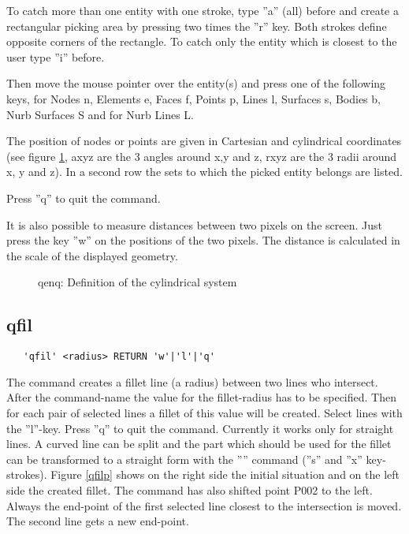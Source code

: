 \documentclass{article}
\begin{document}
To catch more than one entity with one stroke, type ''a'' (all) before and create a rectangular picking area by pressing two times the ''r'' key. Both strokes define opposite corners of the rectangle. To catch only the entity which is closest to the user type ''i'' before.

Then move the mouse pointer over the entity(s) and press one of the following keys, for Nodes n, Elements e, Faces f, Points p, Lines l, Surfaces s, Bodies b, Nurb Surfaces S and for Nurb Lines L.

The position of nodes or points are given in Cartesian and cylindrical coordinates (see figure \ref{qenqp}, axyz are the 3 angles around x,y and z, rxyz are the 3 radii around x, y and z). In a second row the sets to which the picked entity belongs are listed. 

Press ''q'' to quit the command. 

It is also possible to measure distances between two pixels on the screen. Just press the key ''w'' on the positions of the two pixels. The distance is calculated in the scale of the displayed geometry.
  
\begin{figure}[h]
\caption{\label{qenqp}qenq: Definition of the cylindrical system}
\end{figure}

\subsection{\label{qfil}qfil}
\begin{verbatim}
   'qfil' <radius> RETURN 'w'|'l'|'q'
\end{verbatim}
The command creates a fillet line (a radius) between two lines who intersect. After the command-name the value for the fillet-radius has to be specified. Then for each pair of selected lines a fillet of this value will be created. Select lines with the ''l''-key. Press ''q'' to quit the command. Currently it works only for straight lines. A curved line can be split and the part which should be used for the fillet can be transformed to a straight form with the '''' command (''s'' and ''x'' key-strokes). Figure \ref{qfilp} shows on the right side the initial situation and on the left side the created fillet. The command has also shifted point P002 to the left. Always the end-point of the first selected line closest to the intersection is moved. The second line gets a new end-point. 
  
\end{document}
